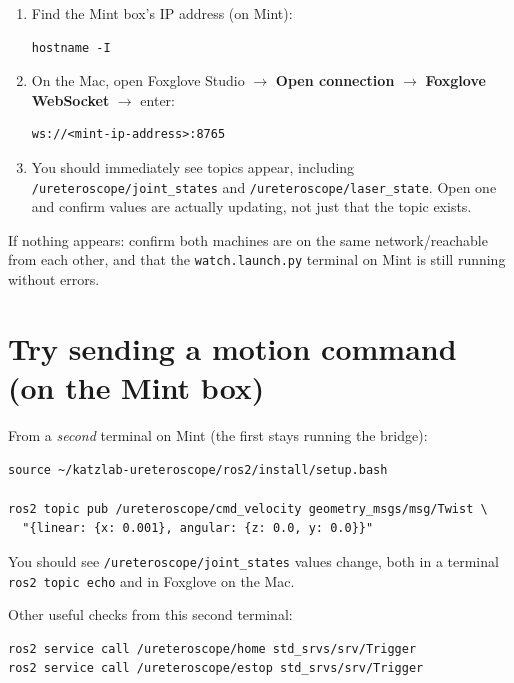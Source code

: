 \documentclass[11pt]{article}
\begin{document}
\begin{enumerate}
  \item Find the Mint box's IP address (on Mint):
\begin{lstlisting}
hostname -I
\end{lstlisting}
  \item On the Mac, open Foxglove Studio $\rightarrow$ \textbf{Open
        connection} $\rightarrow$ \textbf{Foxglove WebSocket}
        $\rightarrow$ enter:
\begin{lstlisting}
ws://<mint-ip-address>:8765
\end{lstlisting}
  \item You should immediately see topics appear, including
        \texttt{/ureteroscope/joint\_states} and
        \texttt{/ureteroscope/laser\_state}. Open one and confirm values
        are actually updating, not just that the topic exists.
\end{enumerate}

If nothing appears: confirm both machines are on the same
network/reachable from each other, and that the \texttt{watch.launch.py}
terminal on Mint is still running without errors.

\section{Try sending a motion command (on the Mint box)}

From a \emph{second} terminal on Mint (the first stays running the
bridge):

\begin{lstlisting}
source ~/katzlab-ureteroscope/ros2/install/setup.bash

ros2 topic pub /ureteroscope/cmd_velocity geometry_msgs/msg/Twist \
  "{linear: {x: 0.001}, angular: {z: 0.0, y: 0.0}}"
\end{lstlisting}

You should see \texttt{/ureteroscope/joint\_states} values change, both
in a terminal \texttt{ros2 topic echo} and in Foxglove on the Mac.

Other useful checks from this second terminal:

\begin{lstlisting}
ros2 service call /ureteroscope/home std_srvs/srv/Trigger
ros2 service call /ureteroscope/estop std_srvs/srv/Trigger
\end{lstlisting}
\end{document}
